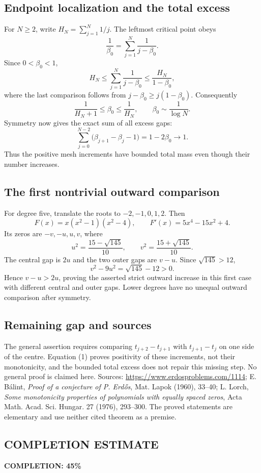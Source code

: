 \subsection*{Endpoint localization and the total excess}
For $N\ge2$, write $H_N=\sum_{j=1}^N1/j$. The leftmost critical point obeys
\[
 \frac1{\beta_0}=\sum_{j=1}^N\frac1{j-\beta_0}.
\]
Since $0<\beta_0<1$,
\[
 H_N\le\sum_{j=1}^N\frac1{j-\beta_0}\le\frac{H_N}{1-\beta_0},
\]
where the last comparison follows from $j-\beta_0\ge j(1-\beta_0)$. Consequently
\[
 \frac1{H_N+1}\le\beta_0\le\frac1{H_N},
 \qquad \beta_0\sim\frac1{\log N}.
\]
Symmetry now gives the exact sum of all excess gaps:
\[
 \sum_{j=0}^{N-2}\bigl(\beta_{j+1}-\beta_j-1\bigr)
 =1-2\beta_0\longrightarrow1.
\]
Thus the positive mesh increments have bounded total mass even though their number increases.

\subsection*{The first nontrivial outward comparison}
For degree five, translate the roots to $-2,-1,0,1,2$. Then
\[
 F(x)=x(x^2-1)(x^2-4),\qquad F'(x)=5x^4-15x^2+4.
\]
Its zeros are $-v,-u,u,v$, where
\[
 u^2=\frac{15-\sqrt{145}}{10},\qquad
 v^2=\frac{15+\sqrt{145}}{10}.
\]
The central gap is $2u$ and the two outer gaps are $v-u$. Since $\sqrt{145}>12$,
\[
 v^2-9u^2=\sqrt{145}-12>0.
\]
Hence $v-u>2u$, proving the asserted strict outward increase in this first case with different central and outer gaps. Lower degrees have no unequal outward comparison after symmetry.

\subsection*{Remaining gap and sources}
The general assertion requires comparing $t_{j+2}-t_{j+1}$ with $t_{j+1}-t_j$ on one side of the centre. Equation (1) proves positivity of these increments, not their monotonicity, and the bounded total excess does not repair this missing step. No general proof is claimed here.
Sources: \url{https://www.erdosproblems.com/1114}; E. B\'alint, \emph{Proof of a conjecture of P. Erd\H{o}s}, Mat. Lapok (1960), 33--40; L. Lorch, \emph{Some monotonicity properties of polynomials with equally spaced zeros}, Acta Math. Acad. Sci. Hungar. 27 (1976), 293--300. The proved statements are elementary and use neither cited theorem as a premise.
\subsection*{COMPLETION ESTIMATE}
\textbf{COMPLETION: 45\%}
